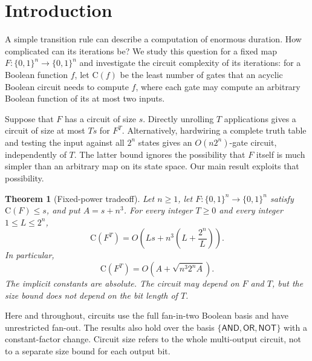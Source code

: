 \documentclass[11pt]{article}
\newtheorem{theorem}{Theorem}[section]
\newtheorem{corollary}[theorem]{Corollary}
\theoremstyle{definition}
\theoremstyle{remark}
\newcommand{\bits}{\{0,1\}}
\newcommand{\CC}{\mathrm{C}}
\numberwithin{equation}{section}
\begin{document}
\section{Introduction}\label{sec:intro}

A simple transition rule can describe a computation of enormous duration.
How complicated can its iterations be? We study this question for a fixed map
$F:\bits^n\to\bits^n$ and investigate the circuit complexity of its iterations: for a
Boolean function $f$, let $\CC(f)$ be the least number of gates that an
acyclic Boolean circuit needs to compute $f$, where each gate may compute
an arbitrary Boolean function of its at most two inputs.

Suppose that $F$ has a circuit of size $s$.  Directly
unrolling $T$ applications gives a circuit of size at most $Ts$ for $F^T$.
Alternatively, hardwiring a complete truth table and testing the input
against all $2^n$ states gives an $O(n2^n)$-gate circuit, independently of $T$.
The latter bound ignores the possibility that $F$ itself is much simpler
than an arbitrary map on its state space.  Our main result exploits that
possibility.

\begin{theorem}[Fixed-power tradeoff]\label{thm:main}
Let $n\geq 1$, let $F:\bits^n\to\bits^n$ satisfy $\CC(F)\leq s$, and put
$A=s+n^3$.  For every integer $T\geq 0$ and every integer
$1\leq L\leq 2^n$,
\begin{equation}\label{eq:tradeoff}
  \CC(F^T)
  =O\!\left(Ls+n^3\left(L+\frac{2^n}{L}\right)\right).
\end{equation}
In particular,
\begin{equation}\label{eq:optimized}
  \CC(F^T)
  =O\!\left(A+\sqrt{n^3 2^n A}\right).
\end{equation}
The implicit constants are absolute.  The circuit may depend on $F$ and
$T$, but the size bound does not depend on the bit length of $T$.
\end{theorem}

Here and throughout, circuits use the full fan-in-two Boolean basis and
have unrestricted fan-out.  The results also hold over the basis
$\{\mathsf{AND},\mathsf{OR},\mathsf{NOT}\}$ with a constant-factor change.
Circuit size refers to the whole multi-output circuit, not to a separate
size bound for each output bit.

\end{document}
